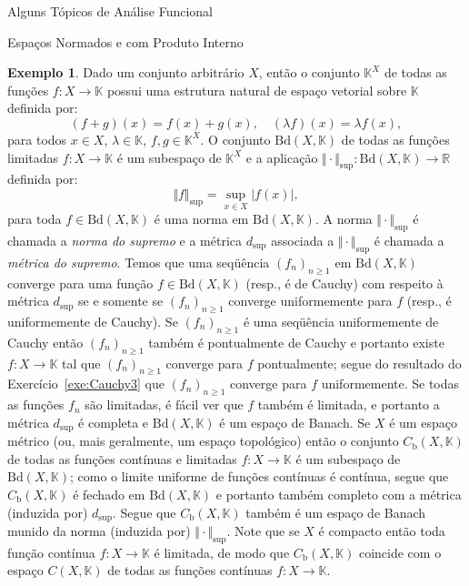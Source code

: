 \documentclass[oneside,final,11pt]{amsbook}
\newcommand{\R}{\mathds R}
\newcommand{\K}{\mathds K}
\newcommand{\Bounded}{\mathrm{Bd}}
\newcommand{\Cb}{C_{\mathrm b}}
\newcommand{\Sup}{\mathrm{sup}}
\theoremstyle{remark}\newtheorem{exercise}{Exercício}[chapter]
\theoremstyle{remark}\newtheorem{*exercise}[exercise]{\hbox to 0pt{\hskip 0pt minus 1fil*}Exercício}
\theoremstyle{definition}\newtheorem{exdefin}{Definição}[chapter]
\theoremstyle{plain}\newtheorem{teo}{Teorema}[section]
\theoremstyle{plain}\newtheorem{lem}[teo]{Lema}
\theoremstyle{plain}\newtheorem{prop}[teo]{Proposição}
\theoremstyle{plain}\newtheorem{cor}[teo]{Corolário}
\theoremstyle{definition}\newtheorem{defin}[teo]{Definição}
\theoremstyle{remark}\newtheorem{rem}[teo]{Observação}
\theoremstyle{definition}\newtheorem{notation}[teo]{Notação}
\theoremstyle{definition}\newtheorem{convention}[teo]{Convenção}
\theoremstyle{definition}\newtheorem{example}[teo]{Exemplo}
\numberwithin{section}{chapter}
\numberwithin{equation}{section}
\begin{document}
\begin{chapter}{Alguns Tópicos de Análise Funcional}
\begin{section}{Espaços Normados e com Produto Interno}
\begin{example}\label{exa:BoundedXK}
Dado um conjunto arbitrário $X$, então o conjunto $\K^X$\index[simbolos]{$\K^X$} de todas as funções $f:X\to\K$ possui uma estrutura
natural de espaço vetorial sobre $\K$ definida por:
\[(f+g)(x)=f(x)+g(x),\quad(\lambda f)(x)=\lambda f(x),\]
para todos $x\in X$, $\lambda\in\K$, $f,g\in\K^X$. O conjunto $\Bounded(X,\K)$\index[simbolos]{$\Bounded(X,\K)$} de todas as funções
limitadas $f:X\to\K$ é um subespaço de $\K^X$ e a aplicação $\Vert\cdot\Vert_\Sup:\Bounded(X,\K)\to\R$\index[simbolos]{$\Vert\cdot\Vert_\Sup$} definida
por:
\[\Vert f\Vert_\Sup=\sup_{x\in X}\big\vert f(x)\big\vert,\]
para toda $f\in\Bounded(X,\K)$ é uma norma em $\Bounded(X,\K)$. A norma $\Vert\cdot\Vert_\Sup$ é chamada a {\em norma do supremo\/}
e a métrica $d_\Sup$ associada a $\Vert\cdot\Vert_\Sup$ é chamada a {\em métrica do supremo}.
Temos que uma seqüência $(f_n)_{n\ge1}$ em $\Bounded(X,\K)$ converge para uma função $f\in\Bounded(X,\K)$
(resp., é de Cauchy) com respeito à métrica $d_\Sup$ se e somente se $(f_n)_{n\ge1}$ converge uniformemente
para $f$ (resp., é uniformemente de Cauchy). Se $(f_n)_{n\ge1}$ é uma seqüência uniformemente de Cauchy
então $(f_n)_{n\ge1}$ também é pontualmente de Cauchy e portanto existe $f:X\to\K$ tal que
$(f_n)_{n\ge1}$ converge para $f$ pontualmente; segue do resultado do Exercício~\ref{exe:Cauchy3}
que $(f_n)_{n\ge1}$ converge para $f$ uniformemente. Se todas as funções $f_n$ são limitadas, é fácil ver que
$f$ também é limitada, e portanto a métrica $d_\Sup$ é completa e $\Bounded(X,\K)$ é um espaço de Banach.
Se $X$ é um espaço métrico (ou, mais geralmente, um espaço topológico) então o conjunto
$\Cb(X,\K)$\index[simbolos]{$\Cb(X,\K)$} de todas as funções contínuas e limitadas $f:X\to\K$ é um subespaço
de $\Bounded(X,\K)$; como o limite uniforme de funções contínuas é contínua, segue que $\Cb(X,\K)$ é fechado
em $\Bounded(X,\K)$ e portanto também completo com a métrica (induzida por) $d_\Sup$. Segue que $\Cb(X,\K)$
também é um espaço de Banach munido da norma (induzida por) $\Vert\cdot\Vert_\Sup$. Note que se $X$ é compacto
então toda função contínua $f:X\to\K$ é limitada, de modo que $\Cb(X,\K)$ coincide com o espaço
$C(X,\K)$\index[simbolos]{$C(X,\K)$} de todas as funções contínuas $f:X\to\K$.
\end{example}


\end{section}
\end{chapter}
\end{document}
